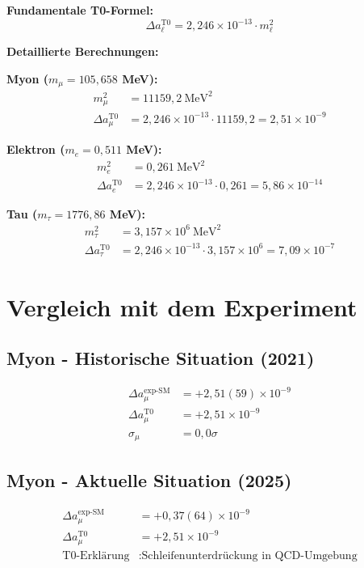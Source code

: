 \documentclass[12pt,a4paper]{article}
\theoremstyle{definition}
\begin{document}
	\begin{formula}
		\textbf{Fundamentale T0-Formel:}
		$$\Delta a_\ell^{\text{T0}} = 2,246 \times 10^{-13} \cdot m_\ell^2$$
		
		\textbf{Detaillierte Berechnungen:}
		
		\textbf{Myon ($m_\mu = 105,658$ MeV):}
		\begin{align}
			m_\mu^2 &= 11159,2 \ \text{MeV}^2\\
			\Delta a_\mu^{\text{T0}} &= 2,246 \times 10^{-13} \cdot 11159,2 = 2,51 \times 10^{-9}
		\end{align}
		
		\textbf{Elektron ($m_e = 0,511$ MeV):}
		\begin{align}
			m_e^2 &= 0,261 \ \text{MeV}^2\\
			\Delta a_e^{\text{T0}} &= 2,246 \times 10^{-13} \cdot 0,261 = 5,86 \times 10^{-14}
		\end{align}
		
		\textbf{Tau ($m_\tau = 1776,86$ MeV):}
		\begin{align}
			m_\tau^2 &= 3,157 \times 10^6 \ \text{MeV}^2\\
			\Delta a_\tau^{\text{T0}} &= 2,246 \times 10^{-13} \cdot 3,157 \times 10^6 = 7,09 \times 10^{-7}
		\end{align}
	\end{formula}
	
	\section{Vergleich mit dem Experiment}
	
	\subsection*{Myon - Historische Situation (2021)}
	\begin{align}
		\Delta a_\mu^{\text{exp-SM}} &= +2,51(59) \times 10^{-9}\\
		\Delta a_\mu^{\text{T0}} &= +2,51 \times 10^{-9}\\
		\sigma_\mu &= 0,0\sigma
	\end{align}
	
	\subsection*{Myon - Aktuelle Situation (2025)}
	\begin{align}
		\Delta a_\mu^{\text{exp-SM}} &= +0,37(64) \times 10^{-9}\\
		\Delta a_\mu^{\text{T0}} &= +2,51 \times 10^{-9}\\
		\text{T0-Erklärung} &: \text{Schleifenunterdrückung in QCD-Umgebung}
	\end{align}
	
\end{document}
